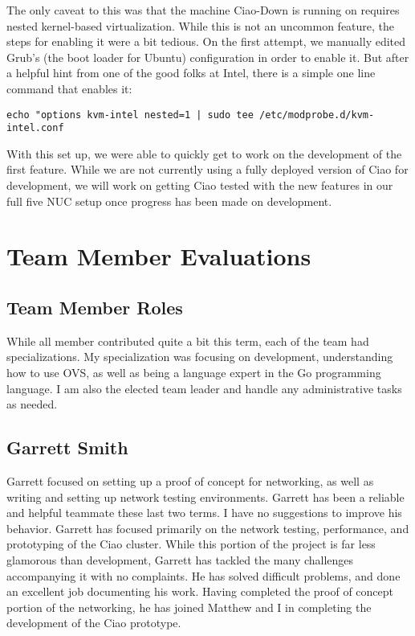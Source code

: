 \documentclass[10pt,onecolumn,journal,draftclsnofoot]{IEEEtran}
\begin{document}
The only caveat to this was that the machine Ciao-Down is running on requires
nested kernel-based virtualization. While this is not an uncommon feature, the
steps for enabling it were a bit tedious. On the first attempt, we manually
edited Grub's (the boot loader for Ubuntu) configuration in order to enable it.
But after a helpful hint from one of the good folks at Intel, there is a simple
one line command that enables it:

\begin{lstlisting}[caption = An easy way to enable nested KVM support]
	echo "options kvm-intel nested=1 | sudo tee /etc/modprobe.d/kvm-intel.conf
\end{lstlisting}

With this set up, we were
able to quickly get to work on the development of the first feature. While we
are not currently using a fully deployed version of Ciao for development, we
will work on getting Ciao tested with the new features in our full five NUC
setup once progress has been made on development.

\section{Team Member Evaluations}
\subsection{Team Member Roles}
While all member contributed quite a bit this term, each of the team had
specializations. My specialization was focusing on development, understanding
how to use OVS, as well as being a language expert in the Go programming language. 
I am also the elected team leader and handle any administrative tasks as needed.

\subsection{Garrett Smith}
Garrett focused on setting up a proof of concept for networking, as well as
writing and setting up network testing environments. Garrett has been a reliable
and helpful teammate these last two terms. I have no suggestions to improve his
behavior. Garrett has focused primarily on the network testing, performance,
and prototyping of the Ciao cluster. While this portion of the project is far
less glamorous than development, Garrett has tackled the many challenges
accompanying it with no complaints. He has solved difficult problems, and 
done an excellent job documenting his work. Having completed the proof of concept
portion of the networking, he has joined Matthew and I in completing the development
of the Ciao prototype.
\end{document}
